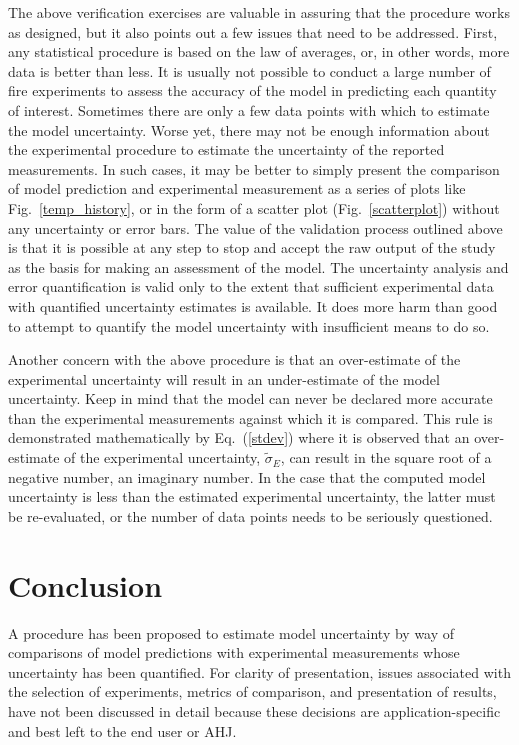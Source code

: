 The above verification exercises are valuable in assuring that the procedure works as designed, but it also points out a few issues that need to be addressed. First, any
statistical procedure is based on the law of averages, or, in other words, more data is better than less. It is usually not possible to conduct a large number of
fire experiments
to assess the accuracy of the model in predicting each quantity of interest. Sometimes there are only a few data points with which to estimate the model uncertainty. Worse yet,
there may not be enough information about the experimental procedure to estimate the uncertainty of the reported measurements. In such cases, it may be better
to simply present the comparison of model prediction and experimental measurement as a series of plots like Fig.~\ref{temp_history}, or in the form of a scatter plot
(Fig.~\ref{scatterplot}) without any uncertainty or error bars. The value of the validation process outlined above is that it is
possible at any step to stop and accept the raw output of the study as the basis for making an assessment of the model.
The uncertainty analysis and error quantification is valid only to
the extent that sufficient experimental data with quantified uncertainty estimates is available.
It does more harm than good to attempt to quantify the model uncertainty
with insufficient means to do so.

Another concern with the above procedure is that an over-estimate of the experimental uncertainty will result in an under-estimate of the model uncertainty. Keep
in mind that the model can never be declared more accurate than the experimental measurements against which it is compared. This rule is demonstrated
mathematically by Eq.~(\ref{stdev}) where it is observed that an over-estimate of the experimental uncertainty, $\widetilde{\sigma}_E$, can result in
the square root of a negative number, an imaginary number. In the case that the computed model uncertainty is less than the estimated experimental uncertainty, the
latter must be re-evaluated, or the number of data points needs to be seriously questioned.



\section{Conclusion}

A procedure has been proposed to estimate model uncertainty by way of comparisons of model predictions with experimental measurements whose uncertainty has been
quantified. For clarity of presentation, issues associated with the selection of experiments, metrics of comparison, and presentation of results, have not been
discussed in detail because these decisions are application-specific and best left to the end user or AHJ.
